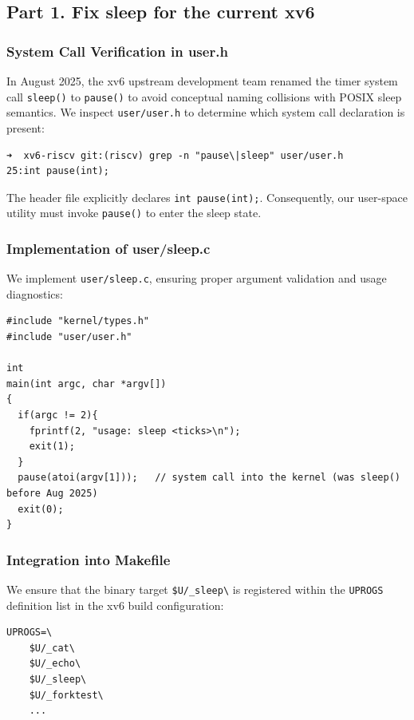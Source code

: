 \documentclass{labreport}
\begin{document}
\subsection{Part 1. Fix sleep for the current xv6}

\subsubsection{System Call Verification in user.h}
In August 2025, the xv6 upstream development team renamed the timer system call \texttt{sleep()} to \texttt{pause()} to avoid conceptual naming collisions with POSIX sleep semantics. We inspect \texttt{user/user.h} to determine which system call declaration is present:

\begin{lstlisting}[style=bash]
➜  xv6-riscv git:(riscv) grep -n "pause\|sleep" user/user.h
25:int pause(int);
\end{lstlisting}
The header file explicitly declares \texttt{int pause(int);}. Consequently, our user-space utility must invoke \texttt{pause()} to enter the sleep state.

\subsubsection{Implementation of user/sleep.c}
We implement \texttt{user/sleep.c}, ensuring proper argument validation and usage diagnostics:

\begin{lstlisting}[style=c]
#include "kernel/types.h"
#include "user/user.h"

int
main(int argc, char *argv[])
{
  if(argc != 2){
    fprintf(2, "usage: sleep <ticks>\n");
    exit(1);
  }
  pause(atoi(argv[1]));   // system call into the kernel (was sleep() before Aug 2025)
  exit(0);
}
\end{lstlisting}

\subsubsection{Integration into Makefile}
We ensure that the binary target \texttt{\$U/\_sleep\textbackslash} is registered within the \texttt{UPROGS} definition list in the xv6 build configuration:
\begin{lstlisting}[style=bash]
UPROGS=\
	$U/_cat\
	$U/_echo\
	$U/_sleep\
	$U/_forktest\
	...
\end{lstlisting}
\end{document}

